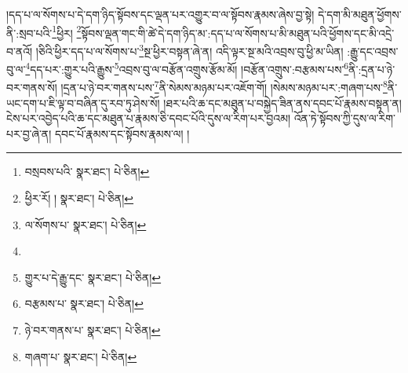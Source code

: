།དད་པ་ལ་སོགས་པ་དེ་དག་ཉིད་སྟོབས་དང་ལྡན་པར་འགྱུར་བ་ལ་སྟོབས་རྣམས་ཞེས་བྱ་སྟེ། དེ་དག་མི་མཐུན་ཕྱོགས་ནི་:སྲབ་པའི་\footnote{བསྲབས་པའི་  སྣར་ཐང་།  པེ་ཅིན། }ཕྱིར། \footnote{ཕྱིར་རོ། །   སྣར་ཐང་།  པེ་ཅིན། }སྟོབས་ལྡན་གང་གི་ཚེ་དེ་དག་ཉིད་མ་:དད་པ་ལ་སོགས་པ་མི་མཐུན་པའི་ཕྱོགས་དང་མི་འདྲེ་བ་ནའོ། །ཅིའི་ཕྱིར་དད་པ་ལ་སོགས་པ་\footnote{ལ་སོགས་པ་  སྣར་ཐང་།  པེ་ཅིན། }སྔ་ཕྱིར་བསྟན་ཞེ་ན། འདི་ལྟར་སྔ་མའི་འབྲས་བུ་ཕྱི་མ་ཡིན། :རྒྱུ་དང་འབྲས་བུ་ལ་\footnote{}དད་པར་:གྱུར་པའི་རྒྱུས་\footnote{གྱུར་པ་དེ་རྒྱུ་དང་  སྣར་ཐང་།  པེ་ཅིན། }འབྲས་བུ་ལ་བརྩོན་འགྲུས་རྩོམ་མོ། །བརྩོན་འགྲུས་:བརྩམས་པས་\footnote{བརྩམས་པ་  སྣར་ཐང་།  པེ་ཅིན། }ནི་:དྲན་པ་ཉེ་བར་གནས་སོ། །དྲན་པ་ཉེ་བར་གནས་པས་\footnote{ཉེ་བར་གནས་པ་  སྣར་ཐང་།  པེ་ཅིན། }ནི་སེམས་མཉམ་པར་འཇོག་གོ། །སེམས་མཉམ་པར་:གཞག་པས་\footnote{གཞག་པ་  སྣར་ཐང་།  པེ་ཅིན། }ནི་ཡང་དག་པ་ཇི་ལྟ་བ་བཞིན་དུ་རབ་ཏུ་ཤེས་སོ། །ཐར་པའི་ཆ་དང་མཐུན་པ་བསྐྱེད་ཟིན་ནས་དབང་པོ་རྣམས་བསྟན་ན། ངེས་པར་འབྱེད་པའི་ཆ་དང་མཐུན་པ་རྣམས་ཅི་དབང་པོའི་དུས་ལ་རིག་པར་བྱའམ། འོན་ཏེ་སྟོབས་ཀྱི་དུས་ལ་རིག་པར་བྱ་ཞེ་ན། དབང་པོ་རྣམས་དང་སྟོབས་རྣམས་ལ། །
